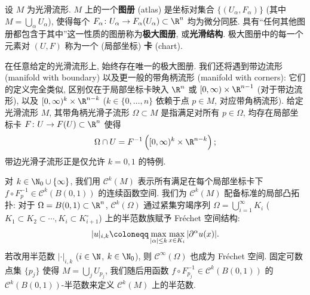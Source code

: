 \begin{definition}[光滑结构与图册]\label{def:5.4}
设 $M$ 为光滑流形. $M$ 上的一个\textbf{图册} (atlas) 是坐标对集合 $\{(U_\alpha, F_\alpha)\}$ (其中 $M = \bigcup_\alpha U_\alpha$), 使得每个 $F_\alpha \colon U_\alpha \to F_\alpha(U_\alpha) \subset \R^n$ 均为微分同胚. 具有``任何其他图册都包含于其中''这一性质的图册称为\textbf{极大图册}, 或\textbf{光滑结构}. 极大图册中的每一个元素对 $(U, F)$ 称为一个 (局部坐标) \textbf{卡} (chart).
\end{definition}

在任意给定的光滑流形上, 始终存在唯一的极大图册. 我们还将遇到带边流形 (manifold with boundary) 以及更一般的带角柄流形 (manifold with corners): 它们的定义完全类似, 区别仅在于局部坐标卡映入 $\R^n$ 或 $[0, \infty) \times \R^{n-1}$ (对于带边流形), 以及 $[0, \infty)^k \times \R^{n-k}$ ($k \in \{0, \ldots, n\}$ 依赖于点 $p \in M$, 对应带角柄流形). 给定光滑流形 $M$, 其带角柄光滑子流形 $\Omega \subset M$ 是指满足对所有 $p \in \Omega$, 均存在局部坐标卡 $F \colon U \to F(U) \subset \R^n$ 使得
\begin{equation}\label{eq:5.16}
    \Omega \cap U = F^{-1}\left( [0, \infty)^k \times \R^{n-k} \right);
\end{equation}
带边光滑子流形正是仅允许 $k = 0, 1$ 的特例.

对 $k \in \N_0 \cup \{\infty\}$, 我们用 $\mathcal{C}^k(M)$ 表示所有满足在每个局部坐标卡下 $f \circ F_p^{-1} \in \mathcal{C}^k(B(0, 1))$ 的连续函数空间. 我们为 $\mathcal{C}^k(M)$ 配备标准的局部凸拓扑: 对于 $\Omega = B(0, 1) \subset \R^n$, $\mathcal{C}^k(\Omega)$ 通过紧集穷竭序列 $\Omega = \bigcup_{i=1}^\infty K_i$ ($K_1 \subset K_2 \subset \cdots, K_i \subset K_{i+1}^\circ$) 上的半范数族赋予 Fréchet 空间结构:
\begin{equation}\label{eq:5.17}
    |u|_{i, k} \defeq \max_{|\alpha| \le k} \max_{x \in K_i} |\partial^\alpha u(x)|.
\end{equation}
若改用半范数 $|\cdot|_{i, k}$ ($i \in \N$, $k \in \N_0$), 则 $\mathcal{C}^\infty(\Omega)$ 也成为 Fr\'echet 空间. 固定可数点集 $\{p_j\}$ 使得 $M = \bigcup_j U_{p_j}$, 我们随后用函数 $f \circ F_{p_j}^{-1} \in \mathcal{C}^k(B(0, 1))$ 的 $\mathcal{C}^k(B(0, 1))$-半范数来定义 $\mathcal{C}^k(M)$ 上的半范数.

